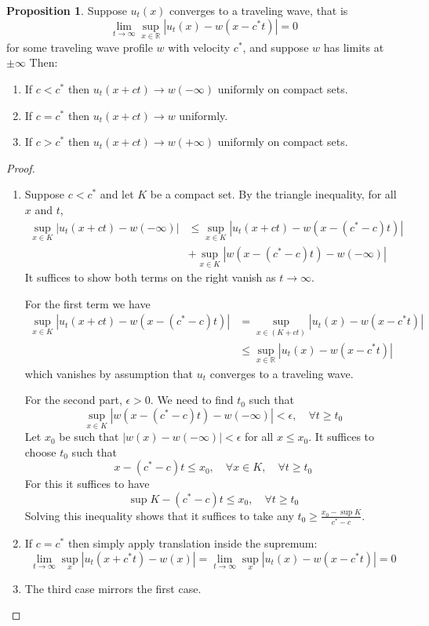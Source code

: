 \documentclass{article}
\theoremstyle{definition}
\newtheorem{proposition}[theorem]{Proposition}
\numberwithin{equation}{section}
\begin{document}
\begin{proposition}
Suppose $u_t(x)$ converges to a traveling wave, that is
$$ \lim_{t\to\infty}\sup_{x \in \mathbb{R}}|u_t(x)-w(x-c^*t)|=0 $$
for some traveling wave profile $w$ with velocity $c^*$, and suppose $w$ has limits at $\pm\infty$ Then:
\begin{enumerate}
\item If $c<c^*$ then $u_t(x+ct) \to w(-\infty)$ uniformly on compact sets.
\item If $c=c^*$ then $u_t(x+ct) \to w$ uniformly.
\item If $c>c^*$ then $u_t(x+ct) \to w(+\infty)$ uniformly on compact sets.
\end{enumerate}
\begin{proof}
\begin{enumerate}
\item Suppose $c<c^*$ and let $K$ be a compact set. By the triangle inequality, for all $x$ and $t$,
$$ \begin{aligned}
\sup_{x \in K} |u_t(x+ct)-w(-\infty)| &\leq \sup_{x \in K} |u_t(x+ct)-w(x-(c^*-c)t)| \\
& + \sup_{x \in K}|w(x-(c^*-c)t)-w(-\infty)|
\end{aligned} $$
It suffices to show both terms on the right vanish as $t \to \infty$.

For the first term we have
$$ \begin{aligned} \sup_{x \in K} |u_t(x+ct)-w(x-(c^*-c)t)| &= \sup_{x \in (K+ct)}|u_t(x)-w(x-c^*t)| \\
&\leq \sup_{x \in \mathbb{R}}|u_t(x)-w(x-c^*t)|
\end{aligned} $$
which vanishes by assumption that $u_t$ converges to a traveling wave.

For the second part, $\epsilon>0$. We need to find $t_0$ such that 
$$ \sup_{x \in K}|w(x-(c^*-c)t)-w(-\infty)| < \epsilon, \quad \forall t \geq t_0$$
Let $x_0$ be such that $|w(x)-w(-\infty)|<\epsilon$ for all $x \leq x_0$. It suffices to choose $t_0$ such that
$$ x-(c^*-c)t \leq x_0, \quad \forall x \in K, \quad \forall t \geq t_0 $$
For this it suffices to have
$$ \sup K-(c^*-c)t \leq x_0, \quad \forall t \geq t_0 $$
Solving this inequality shows that it suffices to take any $\displaystyle t_0 \geq \frac{x_0-\sup K}{c^*-c}$.
\item If $c=c^*$ then simply apply translation inside the supremum:
$$ \lim_{t\to\infty} \sup_x |u_t(x+c^*t)-w(x)| = \lim_{t\to\infty} \sup_x |u_t(x)-w(x-c^*t)| = 0 $$
\item The third case mirrors the first case.
\end{enumerate}
\end{proof}
\end{proposition}
\end{document}
